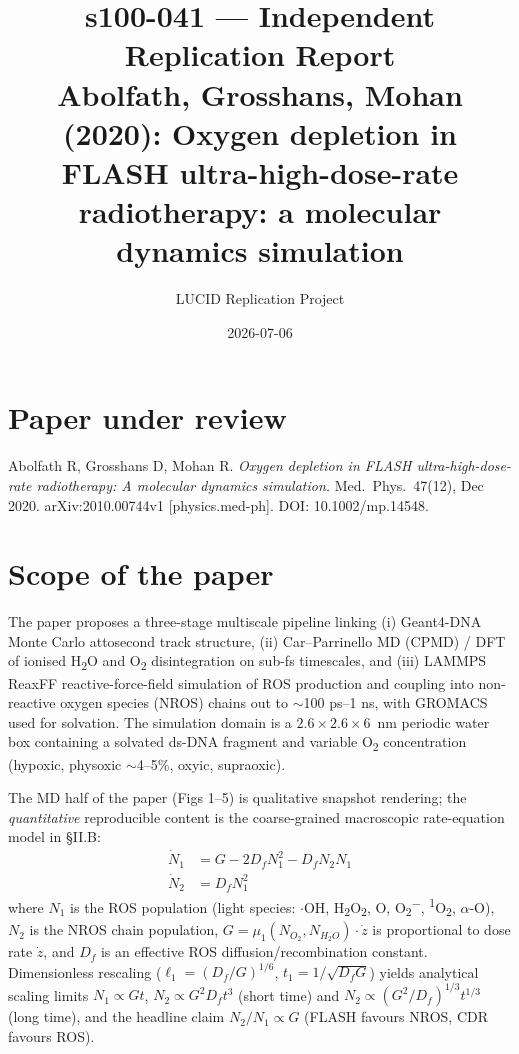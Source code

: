 \documentclass[11pt]{article}
\title{s100-041 --- Independent Replication Report\\
\large Abolfath, Grosshans, Mohan (2020): Oxygen depletion in FLASH ultra-high-dose-rate radiotherapy: a molecular dynamics simulation}
\author{LUCID Replication Project}
\date{2026-07-06}
\begin{document}
\maketitle

\section*{Paper under review}
Abolfath R, Grosshans D, Mohan R. \emph{Oxygen depletion in FLASH ultra-high-dose-rate radiotherapy: A molecular dynamics simulation.} Med.\ Phys.\ 47(12), Dec 2020. arXiv:2010.00744v1 [physics.med-ph]. DOI: 10.1002/mp.14548.

\section{Scope of the paper}
The paper proposes a three-stage multiscale pipeline linking (i) Geant4-DNA Monte Carlo attosecond track structure, (ii) Car--Parrinello MD (CPMD) / DFT of ionised H\textsubscript{2}O and O\textsubscript{2} disintegration on sub-fs timescales, and (iii) LAMMPS ReaxFF reactive-force-field simulation of ROS production and coupling into non-reactive oxygen species (NROS) chains out to $\sim$100 ps--1 ns, with GROMACS used for solvation. The simulation domain is a $2.6\times 2.6\times 6$~nm periodic water box containing a solvated ds-DNA fragment and variable O\textsubscript{2} concentration (hypoxic, physoxic $\sim$4--5\%, oxyic, supraoxic).

The MD half of the paper (Figs 1--5) is qualitative snapshot rendering; the \emph{quantitative} reproducible content is the coarse-grained macroscopic rate-equation model in \S II.B:
\begin{align}
\dot N_1 &= G - 2 D_f N_1^2 - D_f N_2 N_1 \label{eq:1}\\
\dot N_2 &= D_f N_1^2 \label{eq:2}
\end{align}
where $N_1$ is the ROS population (light species: $\cdot$OH, H\textsubscript{2}O\textsubscript{2}, O, O\textsubscript{2}\textsuperscript{$-$}, {}\textsuperscript{1}O\textsubscript{2}, $\alpha$-O), $N_2$ is the NROS chain population, $G = \mu_1(N_{O_2},N_{H_2O})\cdot\dot z$ is proportional to dose rate $\dot z$, and $D_f$ is an effective ROS diffusion/recombination constant. Dimensionless rescaling ($\ell_1=(D_f/G)^{1/6}$, $t_1=1/\sqrt{D_f G}$) yields analytical scaling limits $N_1\propto Gt$, $N_2\propto G^2 D_f t^3$ (short time) and $N_2\propto (G^2/D_f)^{1/3} t^{1/3}$ (long time), and the headline claim $N_2/N_1\propto G$ (FLASH favours NROS, CDR favours ROS).
\end{document}
